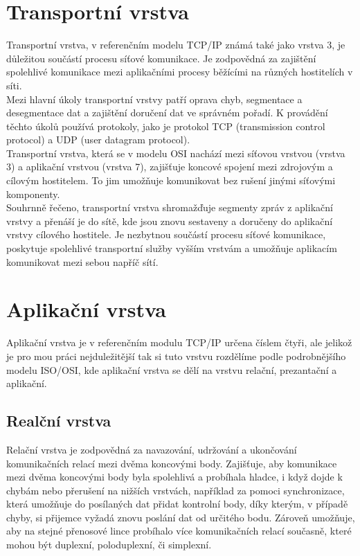 \documentclass[12pt]{report}			%
\begin{document}
			\section{Transportní vrstva}
Transportní vrstva, v referenčním modelu TCP/IP známá také jako vrstva 3, je důležitou součástí procesu síťové komunikace. Je zodpovědná za zajištění spolehlivé komunikace mezi aplikačními procesy běžícími na různých hostitelích v síti.
\\
Mezi hlavní úkoly transportní vrstvy patří oprava chyb, segmentace a desegmentace dat a zajištění doručení dat ve správném pořadí. K provádění těchto úkolů používá protokoly, jako je protokol TCP (transmission control protocol) a UDP (user datagram protocol).
\\
Transportní vrstva, která se v modelu OSI nachází mezi síťovou vrstvou (vrstva 3) a aplikační vrstvou (vrstva 7), zajišťuje koncové spojení mezi zdrojovým a cílovým hostitelem. To jim umožňuje komunikovat bez rušení jinými síťovými komponenty.
\\
Souhrnně řečeno, transportní vrstva shromažďuje segmenty zpráv z aplikační vrstvy a přenáší je do sítě, kde jsou znovu sestaveny a doručeny do aplikační vrstvy cílového hostitele. Je nezbytnou součástí procesu síťové komunikace, poskytuje spolehlivé transportní služby vyšším vrstvám a umožňuje aplikacím komunikovat mezi sebou napříč sítí.
\\

\cite{tran_1}
\cite{tran_2}
\cite{tran_3}
			\section{Aplikační  vrstva}
 Aplikační vrstva je v referenčním modulu TCP/IP určena číslem čtyři, ale jelikož je pro mou práci nejduležitější tak si tuto vrstvu rozdělíme podle podrobnějšího modelu ISO/OSI, kde aplikační vrstva se dělí na vrstvu relační, prezantační a aplikační. 
				\subsection{Realční vrstva}
Relační vrstva je zodpovědná za navazování, udržování a ukončování komunikačních relací mezi dvěma koncovými body. Zajišťuje, aby komunikace mezi dvěma koncovými body byla spolehlivá a probíhala hladce, i když dojde k chybám nebo přerušení na nižších vrstvách, například za pomoci synchronizace, která umožňuje do posílaných dat přidat kontrolní body, díky kterým, v případě chyby, si přijemce vyžadá znovu poslání dat od určitého bodu. Zároveň umožňuje, aby na stejné přenosové lince probíhalo více komunikačních relací současně, které mohou být duplexní, poloduplexní, či simplexní. 
\end{document}
